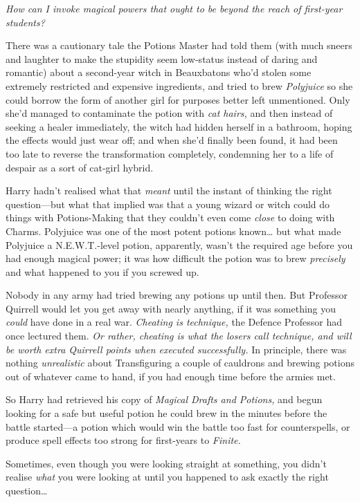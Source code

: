 \emph{How can I invoke magical powers that ought to be beyond the reach
of first-year students?}

There was a cautionary tale the Potions Master had told them (with much
sneers and laughter to make the stupidity seem low-status instead of
daring and romantic) about a second-year witch in Beauxbatons who'd
stolen some extremely restricted and expensive ingredients, and tried to
brew \emph{Polyjuice} so she could borrow the form of another girl for
purposes better left unmentioned. Only she'd managed to contaminate the
potion with \emph{cat hairs,} and then instead of seeking a healer
immediately, the witch had hidden herself in a bathroom, hoping the
effects would just wear off; and when she'd finally been found, it had
been too late to reverse the transformation completely, condemning her
to a life of despair as a sort of cat-girl hybrid.

Harry hadn't realised what that \emph{meant} until the instant of
thinking the right question---but what that implied was that a young
wizard or witch could do things with Potions-Making that they couldn't
even come \emph{close} to doing with Charms. Polyjuice was one of the
most potent potions known\ldots{} but what made Polyjuice a
N.E.W.T.-level potion, apparently, wasn't the required age before you
had enough magical power; it was how difficult the potion was to brew
\emph{precisely} and what happened to you if you screwed up.

Nobody in any army had tried brewing any potions up until then. But
Professor Quirrell would let you get away with nearly anything, if it
was something you \emph{could} have done in a real war. \emph{Cheating
is technique,} the Defence Professor had once lectured them. \emph{Or
rather, cheating is what the losers call technique, and will be worth
extra Quirrell points when executed successfully.} In principle, there
was nothing \emph{unrealistic} about Transfiguring a couple of cauldrons
and brewing potions out of whatever came to hand, if you had enough time
before the armies met.

So Harry had retrieved his copy of \emph{Magical Drafts and Potions,}
and begun looking for a safe but useful potion he could brew in the
minutes before the battle started---a potion which would win the battle
too fast for counterspells, or produce spell effects too strong for
first-years to \emph{Finite.}

Sometimes, even though you were looking straight at something, you
didn't realise \emph{what} you were looking at until you happened to ask
exactly the right question\ldots{}

